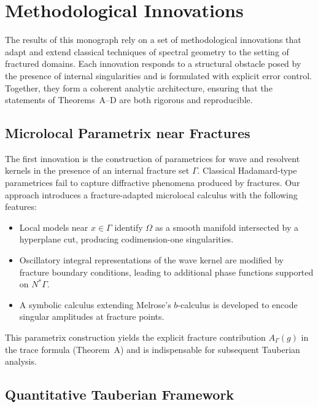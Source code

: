 \section{Methodological Innovations}

The results of this monograph rely on a set of methodological innovations
that adapt and extend classical techniques of spectral geometry to the setting
of fractured domains. Each innovation responds to a structural obstacle posed
by the presence of internal singularities and is formulated with explicit
error control. Together, they form a coherent analytic architecture, ensuring
that the statements of Theorems~A--D are both rigorous and reproducible.

\subsection{Microlocal Parametrix near Fractures}

The first innovation is the construction of parametrices for wave and resolvent
kernels in the presence of an internal fracture set $\Gamma$. Classical
Hadamard-type parametrices fail to capture diffractive phenomena produced by
fractures. Our approach introduces a fracture-adapted microlocal calculus with
the following features:

\begin{itemize}
  \item Local models near $x\in\Gamma$ identify $\Omega$ as a smooth manifold
  intersected by a hyperplane cut, producing codimension-one singularities.
  \item Oscillatory integral representations of the wave kernel are modified by
  fracture boundary conditions, leading to additional phase functions supported
  on $N^\ast\Gamma$.
  \item A symbolic calculus extending Melrose's $b$-calculus is developed to
  encode singular amplitudes at fracture points.
\end{itemize}

This parametrix construction yields the explicit fracture contribution
$A_\Gamma(g)$ in the trace formula (Theorem~A) and is indispensable for
subsequent Tauberian analysis.

\subsection{Quantitative Tauberian Framework}

